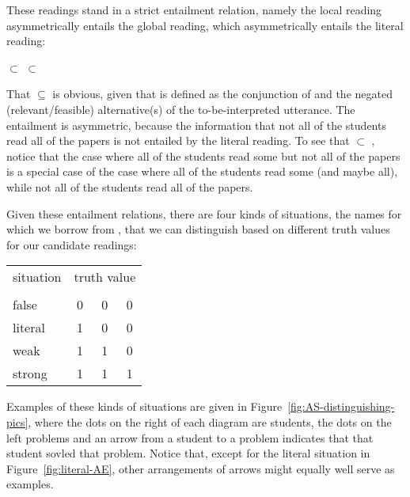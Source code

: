 \documentclass[fleqn,reqno,10pt,draft]{article}
\newcommand{\lit}{\acro{lit}}
\newcommand{\glb}{\acro{glb}}
\newcommand{\loc}{\acro{loc}}
\begin{document}
\noindent These readings stand in a strict entailment relation,
namely the local reading asymmetrically entails the global reading,
which asymmetrically entails the literal reading:
\begin{exe}
  \ex \label{bsp:Entailments-AS} \loc $\subset$ \glb $\subset$ \lit
\end{exe}
That \glb $\subseteq$ \lit is obvious, given that \glb is defined as the
conjunction of \lit and the negated (relevant/feasible) alternative(s)
of the to-be-interpreted utterance. The entailment is asymmetric,
because the information that not all of the students read all of the
papers is not entailed by the literal reading. To see that \loc
$\subset$ \glb, notice that the case where all of the students read
some but not all of the papers is a special case of the case where all
of the students read some (and maybe all), while not all of the
students read all of the papers.

Given these entailment relations, there are four kinds of situations,
the names for which we borrow from
\citet{ChemlaSpector2010:Experimental-Ev}, that we can distinguish
based on different truth values for our candidate readings:

\begin{center}
  \begin{tabular}{lccc}
    \toprule
    situation    & \multicolumn{3}{c}{truth value} 
  \\ 
  \cmidrule(r){2-4}
     & \lit & \glb & \loc \\ \midrule
    false   & 0 & 0 & 0 \\
    literal & 1 & 0 & 0 \\
    weak    & 1 & 1 & 0 \\
    strong  & 1 & 1 & 1 \\ \bottomrule
  \end{tabular}
\end{center}

\noindent Examples of these kinds of situations are given in
Figure~\ref{fig:AS-distinguishing-pics}, where the dots on the right
of each diagram are students, the dots on the left problems and an
arrow from a student to a problem indicates that that student sovled
that problem. Notice that, except for the literal
situation in
Figure~\ref{fig:literal-AE},
other arrangements of arrows might equally well serve as examples.
\end{document}
